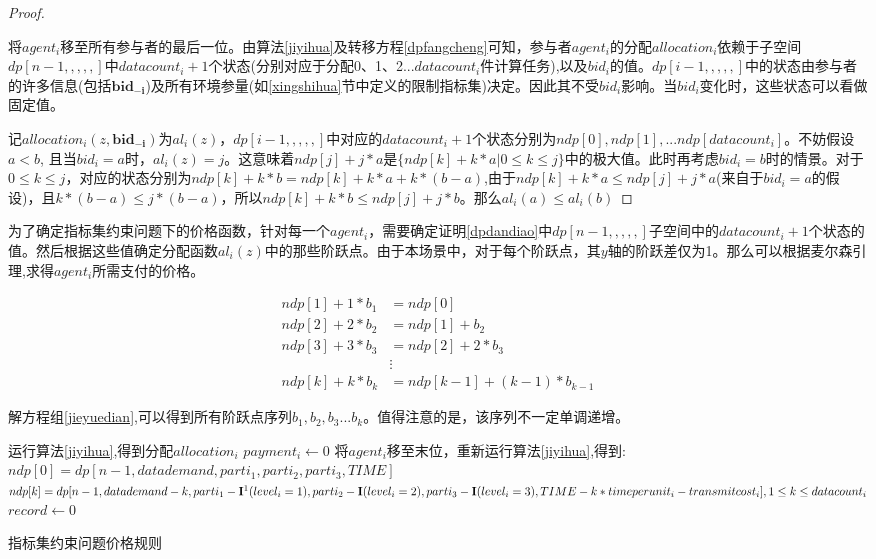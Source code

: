 \documentclass[promaster]{thesis-uestc}
\begin{document}
\begin{proof}

\label{dpdandiao}

将$agent_i$移至所有参与者的最后一位。由算法\ref{jiyihua}及转移方程\ref{dpfangcheng}可知，参与者$agent_i$的分配$allocation_i$依赖于子空间$dp[n-1,,,,,]$中$datacount_i+1$个状态(分别对应于分配0、1、2...$datacount_i$件计算任务),以及$bid_i$的值。$dp[i-1,,,,,]$中的状态由参与者的许多信息(包括$\mathbf{bid_{-i}}$)及所有环境参量(如\ref{xingshihua}节中定义的限制指标集)决定。因此其不受$bid_i$影响。当$bid_i$变化时，这些状态可以看做固定值。

记$allocation_i(z,\mathbf{bid_{-i}})$为$al_i(z)$，$dp[i-1,,,,,]$中对应的$datacount_i+1$个状态分别为$ndp[0],ndp[1],...ndp[datacount_i]$。不妨假设$a < b$, 且当$bid_i = a$时，$al_i(z) = j$。这意味着$ndp[j]+j*a$是$\{ndp[k] + k*a|0 \leq k \leq j\}$中的极大值。此时再考虑$bid_i=b$时的情景。对于$ 0\leq k\leq j$，对应的状态分别为$ndp[k]+k*b=ndp[k]+k*a+k*(b-a)$,由于$ndp[k]+k*a\leq ndp[j]+j*a$(来自于$bid_i=a$的假设)，且$k*(b-a)\leq j*(b-a)$，所以$ndp[k]+k*b \leq ndp[j]+j*b$。那么$al_i(a)\leq al_i(b)$
\end{proof}

为了确定指标集约束问题下的价格函数，针对每一个$agent_i$，需要确定证明\ref{dpdandiao}中$dp[n-1,,,,,]$子空间中的$datacount_i+1$个状态的值。然后根据这些值确定分配函数$al_i(z)$中的那些阶跃点。由于本场景中，对于每个阶跃点，其$y$轴的阶跃差仅为1。那么可以根据麦尔森引理,求得$agent_i$所需支付的价格。

\begin{equation}
\label{jieyuedian}
 \begin{aligned}
 ndp[1]+1*b_1&=ndp[0]\\
 ndp[2]+2*b_2&=ndp[1]+b_2\\
 ndp[3]+3*b_3&=ndp[2]+2*b_3\\
 &\vdots\\
 ndp[k]+k*b_k&=ndp[k-1]+(k-1)*b_{k-1}
 \end{aligned}
\end{equation}

解方程组\ref{jieyuedian},可以得到所有阶跃点序列$b_1,b_2,b_3...b_k$。值得注意的是，该序列不一定单调递增。

\setcounter{footnote}{0}

\begin{algorithm}[h]
    运行算法\ref{jiyihua},得到分配$allocation_i$\;
    {
        $payment_i \leftarrow 0$\;
        将$agent_i$移至末位，重新运行算法\ref{jiyihua},得到:\;
        $ndp[0] = dp[n-1,datademand,parti_1,parti_2,parti_3,TIME]$\;
        $ndp[k] = dp[n-1,datademand-k,parti_1-\mathbf{I\footnotemark}(level_i=1),parti_2-\mathbf{I}(level_i=2),parti_3-\mathbf{I}(level_i=3),TIME-k*timeperunit_i-transmitcost_i],1\leq k\leq datacount_i$\;
        $record \leftarrow 0$\;
    }
\caption{指标集约束问题价格规则}
\label{dp_zhifu}
\end{algorithm}
\end{document}
